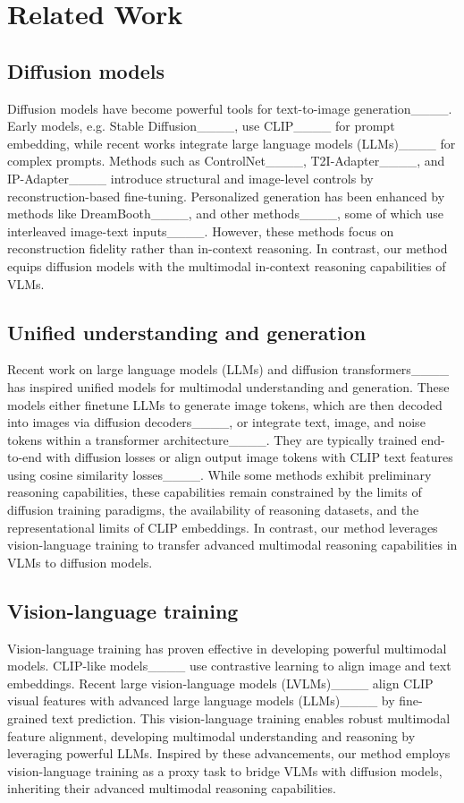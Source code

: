\section{Related Work}
\subsection{Diffusion models}

Diffusion models have become powerful tools for text-to-image generation____. Early models, e.g. Stable Diffusion____, use CLIP____ for prompt embedding, while recent works integrate large language models (LLMs)____ for complex prompts. Methods such as ControlNet____, T2I-Adapter____, and IP-Adapter____ introduce structural and image-level controls by reconstruction-based fine-tuning. Personalized generation has been enhanced by methods like DreamBooth____, and other methods____, some of which use interleaved image-text inputs____. However, these methods focus on reconstruction fidelity rather than in-context reasoning. In contrast, our method equips diffusion models with the multimodal in-context reasoning capabilities of VLMs.


\subsection{Unified understanding and generation}

Recent work on large language models (LLMs) and diffusion transformers____ has inspired unified models for multimodal understanding and generation. These models either finetune LLMs to generate image tokens, which are then decoded into images via diffusion decoders____, or integrate text, image, and noise tokens within a transformer architecture____. They are typically trained end-to-end with diffusion losses or align output image tokens with CLIP text features using cosine similarity losses____. While some methods exhibit preliminary reasoning capabilities, these capabilities remain constrained by the limits of diffusion training paradigms, the availability of reasoning datasets, and the representational limits of CLIP embeddings. In contrast, our method leverages vision-language training to transfer advanced multimodal reasoning capabilities in VLMs to diffusion models. 



\subsection{Vision-language training}
Vision-language training has proven effective in developing powerful multimodal models. CLIP-like models____ use contrastive learning to align image and text embeddings. Recent large vision-language models (LVLMs)____ align CLIP visual features with advanced large language models (LLMs)____ by fine-grained text prediction. This vision-language training enables robust multimodal feature alignment, developing multimodal understanding and reasoning by leveraging powerful LLMs.  Inspired by these advancements, our method employs vision-language training as a proxy task to bridge VLMs with diffusion models, inheriting their advanced multimodal reasoning capabilities.

